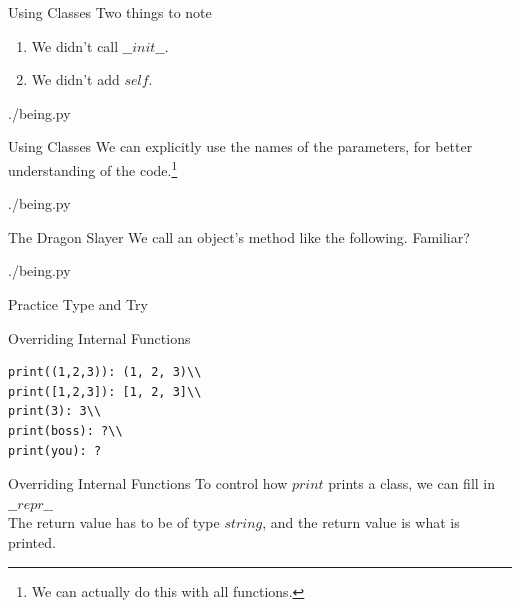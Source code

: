 \documentclass{beamer}
\begin{document}
\begin{frame}{Using Classes}
  Two things to note
  \begin{enumerate}
    \item We didn't call $\_\_init\_\_$.
    \item We didn't add $self$.
  \end{enumerate}
  \begin{lstinputlisting}[firstline=25, lastline=25]
    {./being.py}
  \end{lstinputlisting}
\end{frame}

\begin{frame}{Using Classes}
  We can explicitly use the names of the parameters, for better understanding of the
  code.\footnote{We can actually do this with all functions.}
  \begin{lstinputlisting}[firstline=26, lastline=27]
    {./being.py}
  \end{lstinputlisting}
\end{frame}

\begin{frame}{The Dragon Slayer}
  We call an object's method like the following. Familiar?
  \begin{lstinputlisting}[firstline=29, lastline=29]
    {./being.py}
  \end{lstinputlisting}
\end{frame}

\begin{frame}{Practice}
  Type and Try
\end{frame}

\begin{frame}[fragile]{Overriding Internal Functions}
  \begin{lstlisting}
print((1,2,3)): (1, 2, 3)\\
print([1,2,3]): [1, 2, 3]\\
print(3): 3\\
print(boss): ?\\
print(you): ?
  \end{lstlisting}
\end{frame}

\begin{frame}{Overriding Internal Functions}
  To control how $print$ prints a class, we can fill in\\
  $\_\_repr\_\_$\\
  The return value has to be of type $string$, and the return value is what is printed.
\end{frame}
\end{document}
